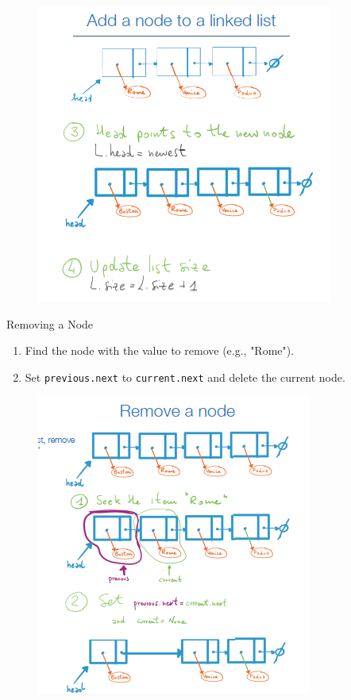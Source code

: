\begin{figure}[h!]
\begin{minipage}{0.45\textwidth}
          \includegraphics[width=\textwidth]{immagini/linkl2.png}
        \end{minipage}
        \label{fig:two_images}
    \end{figure}
    \newpage
    Removing a Node
    \begin{enumerate}
        \item Find the node with the value to remove (e.g., "Rome").
        \item Set \texttt{previous.next} to \texttt{current.next} and delete the current node.
    \end{enumerate}
    \begin{figure}[h!]
        \centering
        \includegraphics[width=0.5\linewidth]{immagini/linkl3.png}
    \end{figure}

